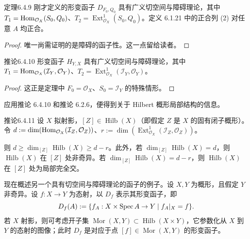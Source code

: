 \begin{origstatement}{定理}{6.4.9}\label{ch06:6.4.9}
刚才定义的形变函子 $D_{F_0,Q_0}$ 具有广义切空间与障碍理论，其中 $T_1=\operatorname{Hom}_{\mathcal O_X}(S_0,Q_0)$、$T_2=\operatorname{Ext}^1_{\mathcal O_X}(S_0,Q_0)$。定义 6.1.21 中的正合列 (2) 对任意 $A$ 均正合。
\end{origstatement}
\begin{proof}
唯一尚需证明的是障碍的函子性。这一点留给读者。
\end{proof}
\begin{origstatement}{推论}{6.4.10}\label{ch06:6.4.10}
形变函子 $H_{Y,X}$ 具有广义切空间与障碍理论，其中 $T_1=\operatorname{Hom}_{\mathcal O_X}(\mathcal I_Y,\mathcal O_Y)$、$T_2=\operatorname{Ext}^1_{\mathcal O_X}(\mathcal I_Y,\mathcal O_Y)$。
\end{origstatement}
\begin{proof}
这正是定理中 $F_0=\mathcal O_X$、$S_0=\mathcal I_Y$ 的特殊情形。
\end{proof}
应用推论 6.4.10 和推论 6.2.6，便得到关于 Hilbert 概形局部结构的信息。

\begin{origstatement}{推论}{6.4.11}\label{ch06:6.4.11}
设 $X$ 拟射影，$[Z]\in\operatorname{Hilb}(X)$（即假定 $Z$ 是 $X$ 的固有闭子概形）。令 $d:=\dim(\operatorname{Hom}_{\mathcal O_X}(\mathcal I_Z,\mathcal O_Z))$、$r:=\dim(\operatorname{Ext}^1_{\mathcal O_X}(\mathcal I_Z,\mathcal O_Z))$。

则 $d\geq\dim_{[Z]}\operatorname{Hilb}(X)\geq d-r$。此外，若 $\dim_{[Z]}\operatorname{Hilb}(X)=d$，则 $\operatorname{Hilb}(X)$ 在 $[Z]$ 处非奇异。若 $\dim_{[Z]}\operatorname{Hilb}(X)=d-r$，则 $\operatorname{Hilb}(X)$ 在 $[Z]$ 处为局部完全交。
\end{origstatement}
现在概述另一个具有切空间与障碍理论的函子的例子。设 $X,Y$ 为概形，且假定 $Y$ 非奇异。设 $f:X\to Y$ 为态射，以 $D_f$ 表示其形变函子，即
\[
D_f(A):=\{f_A:X\times\operatorname{Spec} A\to Y\mid f_A|_X=f\}.
\]
若 $X$ 射影，则可考虑开子集 $\operatorname{Mor}(X,Y)\subset\operatorname{Hilb}(X\times Y)$，它参数化从 $X$ 到 $Y$ 的态射的图像；此时 $D_f$ 是对应于点 $[f]\in\operatorname{Mor}(X,Y)$ 的形变函子。

